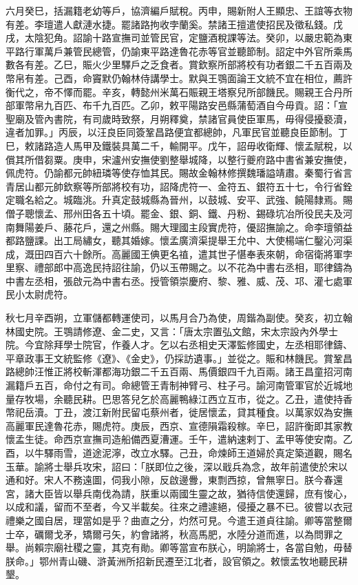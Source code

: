 \begin{pinyinscope}
 六月癸巳，括漏籍老幼等戶，協濟編戶賦稅。丙申，賜新附人王顯忠、王誼等衣物有差。李璮遣人獻漣水捷。罷諸路拘收孛蘭奚。禁諸王擅遣使招民及徵私錢。戊戌，太陰犯角。詔諭十路宣撫司並管民官，定鹽酒稅課等法。癸卯，以嚴忠範為東平路行軍萬戶兼管民總管，仍諭東平路達魯花赤等官並聽節制。詔定中外官所乘馬數各有差。乙巳，賑火少里驛戶之乏食者。賞欽察所部將校有功者銀二千五百兩及幣帛有差。己酉，命竇默仍翰林侍講學士。默與王鶚面論王文統不宜在相位，薦許衡代之，帝不懌而罷。辛亥，轉懿州米萬石賑親王塔察兒所部饑民。賜親王合丹所部軍幣帛九百匹、布千九百匹。乙卯，敕平陽路安邑縣蒲萄酒自今毋貢。詔：「宣聖廟及管內書院，有司歲時致祭，月朔釋奠，禁諸官員使臣軍馬，毋得侵擾褻瀆，違者加罪。」丙辰，以汪良臣同簽鞏昌路便宜都總帥，凡軍民官並聽良臣節制。丁巳，敕諸路造人馬甲及鐵裝具萬二千，輸開平。戊午，詔毋收衛輝、懷孟賦稅，以償其所借芻粟。庚申，宋瀘州安撫使劉整舉城降，以整行夔府路中書省兼安撫使，佩虎符。仍諭都元帥紐璘等使存恤其民。賜故金翰林修撰魏璠謚靖肅。秦蜀行省言青居山都元帥欽察等所部將校有功，詔降虎符一、金符五、銀符五十七，令行省銓定職名給之。城臨洮。升真定鼓城縣為晉州，以鼓城、安平、武強、饒陽隸焉。賜僧子聰懷孟、邢州田各五十頃。罷金、銀、銅、鐵、丹粉、錫碌坑冶所役民夫及河南舞陽姜戶、藤花戶，還之州縣。賜大理國主段實虎符，優詔撫諭之。命李璮領益都路鹽課。出工局繡女，聽其婚嫁。懷孟廣濟渠提舉王允中、大使楊端仁鑿沁河渠成，溉田四百六十餘所。高麗國王倎更名禃，遣其世子愖奉表來朝，命宿衛將軍孛里察、禮部郎中高逸民持詔往諭，仍以玉帶賜之。以不花為中書右丞相，耶律鑄為中書左丞相，張啟元為中書右丞。授管領崇慶府、黎、雅、威、茂、邛、灌七處軍民小太尉虎符。



 秋七月辛酉朔，立軍儲都轉運使司，以馬月合乃為使，周鍇為副使。癸亥，初立翰林國史院。王鶚請修遼、金二史，又言：「唐太宗置弘文館，宋太宗設內外學士院。今宜除拜學士院官，作養人才。乞以右丞相史天澤監修國史，左丞相耶律鑄、平章政事王文統監修《遼》、《金史》，仍採訪遺事。」並從之。賑和林饑民。賞鞏昌路總帥汪惟正將校斬渾都海功銀二千五百兩、馬價銀四千九百兩。諸王昌童招河南漏籍戶五百，命付之有司。命總管王青制神臂弓、柱子弓。諭河南管軍官於近城地量存牧場，余聽民耕。巴思答兒乞於高麗鴨綠江西立互市，從之。乙丑，遣使持香幣祀岳瀆。丁丑，渡江新附民留屯蔡州者，徙居懷孟，貸其種食。以萬家奴為安撫高麗軍民達魯花赤，賜虎符。庚辰，西京、宣德隕霜殺稼。辛巳，詔許衡即其家教懷孟生徒。命西京宣撫司造船備西夏漕運。壬午，遣納速剌丁、孟甲等使安南。乙酉，以牛驛雨雪，道途泥濘，改立水驛。己丑，命煉師王道婦於真定築道觀，賜名玉華。諭將士舉兵攻宋，詔曰：「朕即位之後，深以戢兵為念，故年前遣使於宋以通和好。宋人不務遠圖，伺我小隙，反啟邊釁，東剽西掠，曾無寧日。朕今春還宮，諸大臣皆以舉兵南伐為請，朕重以兩國生靈之故，猶待信使還歸，庶有悛心，以成和議，留而不至者，今又半載矣。往來之禮遽絕，侵擾之暴不已。彼嘗以衣冠禮樂之國自居，理當如是乎？曲直之分，灼然可見。今遣王道貞往諭。卿等當整爾士卒，礪爾戈矛，矯爾弓矢，約會諸將，秋高馬肥，水陸分道而進，以為問罪之舉。尚賴宗廟社稷之靈，其克有勛。卿等當宣布朕心，明諭將士，各當自勉，毋替朕命。」鄂州青山磯、滸黃洲所招新民遷至江北者，設官領之。敕懷孟牧地聽民耕墾。




\end{pinyinscope}
